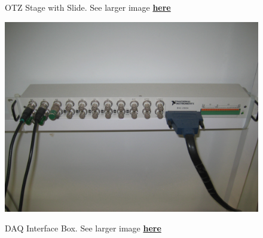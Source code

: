 \documentclass{../lab}
\begin{document}
\begin{figure}[h]
\begin{minipage}{0.28\textwidth}
    \caption{OTZ Stage with Slide. See larger image \href{http://experimentationlab.berkeley.edu/sites/default/files/images/OTZ_3551_Crop.jpg}{\textbf{here}}}
\end{minipage}
\begin{minipage}{0.34\textwidth}
    \href{http://experimentationlab.berkeley.edu/sites/default/files/images/OTZ_DAQ_Interface_3554.jpg}{\includegraphics[width=\linewidth,keepaspectratio]{images/OTZ_DAQ_Interface_3554.jpg}}
    \caption{DAQ Interface Box. See larger image \href{http://experimentationlab.berkeley.edu/sites/default/files/images/OTZ_DAQ_Interface_3554.jpg}{\textbf{here}}}
\end{minipage}
\end{figure}
\end{document}

